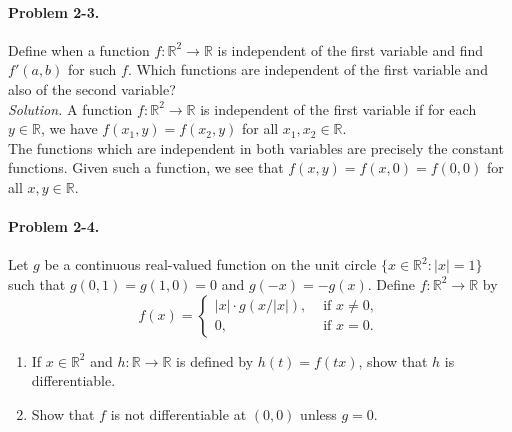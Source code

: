 \documentclass[11pt]{report}
\newcommand{\R}{\mathbb{R}}
\newcommand{\problem}[1]{\paragraph{Problem #1.}}
\newcommand{\solution}{\noindent\textit{Solution.} }
\begin{document}
    \problem{2-3} Define when a function $f\colon \R^2 \to \R$ is independent of the
    first variable and find $f'(a, b)$ for such $f$. Which functions are independent
    of the first variable and also of the second variable? \\

    \solution A function $f\colon \R^2 \to \R$ is independent of the first variable
    if for each $y \in \R$, we have $f(x_1, y) = f(x_2, y)$ for all $x_1, x_2 \in
    \R$. \\

    The functions which are independent in both variables are precisely the constant
    functions. Given such a function, we see that $f(x, y) = f(x, 0) = f(0, 0)$ for
    all $x, y \in \R$.


    \problem{2-4} Let $g$ be a continuous real-valued function on the unit circle
    $\{x \in \R^2: |x| = 1\}$ such that $g(0, 1) = g(1, 0) = 0$ and $g(-x) = - g(x)$.
    Define $f\colon \R^2 \to \R$ by \[
        f(x) = \begin{cases}
            |x|\cdot g(x / |x|), &\text{ if }x \neq 0, \\
            0, &\text{ if }x =  0.
        \end{cases}
    \] 
    \begin{enumerate}
        \item If $x \in \R^2$ and $h\colon \R \to \R$ is defined by $h(t) = f(tx)$,
        show that $h$ is differentiable.
        \item Show that $f$ is not differentiable at $(0, 0)$ unless $g = 0$.
    \end{enumerate}
\end{document}
